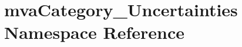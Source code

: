 \hypertarget{namespacemvaCategory__Uncertainties}{
\section{mvaCategory\_\-Uncertainties Namespace Reference}
\label{namespacemvaCategory__Uncertainties}
}
